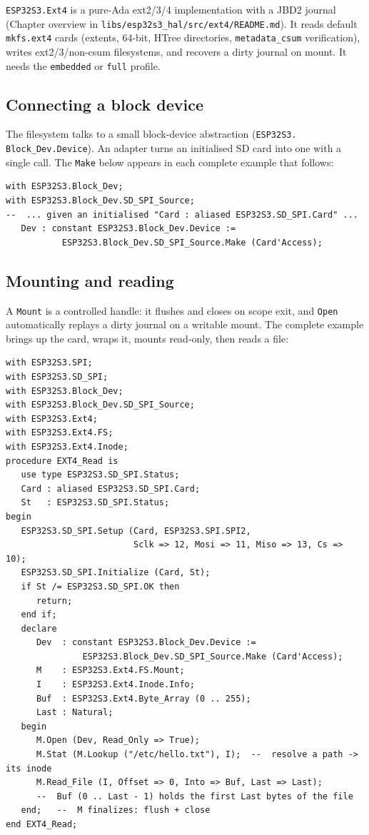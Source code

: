 \texttt{ESP32S3.Ext4} is a pure-Ada ext2/3/4 implementation with a JBD2 journal
(Chapter overview in \texttt{libs/esp32s3\_hal/src/ext4/README.md}). It reads
default \texttt{mkfs.ext4} cards (extents, 64-bit, HTree directories,
\texttt{metadata\_csum} verification), writes ext2/3/non-csum filesystems, and
recovers a dirty journal on mount. It needs the \texttt{embedded} or \texttt{full}
profile.

\subsection{Connecting a block device}

The filesystem talks to a small block-device abstraction (\texttt{ESP32S3.%
Block\_Dev.Device}). An adapter turns an initialised SD card into one with a
single call. The \texttt{Make} below appears in each complete example that
follows:

\begin{lstlisting}
with ESP32S3.Block_Dev;
with ESP32S3.Block_Dev.SD_SPI_Source;
--  ... given an initialised "Card : aliased ESP32S3.SD_SPI.Card" ...
   Dev : constant ESP32S3.Block_Dev.Device :=
           ESP32S3.Block_Dev.SD_SPI_Source.Make (Card'Access);
\end{lstlisting}

\subsection{Mounting and reading}

A \texttt{Mount} is a controlled handle: it flushes and closes on scope exit, and
\texttt{Open} automatically replays a dirty journal on a writable mount. The
complete example brings up the card, wraps it, mounts read-only, then reads a
file:

\begin{lstlisting}
with ESP32S3.SPI;
with ESP32S3.SD_SPI;
with ESP32S3.Block_Dev;
with ESP32S3.Block_Dev.SD_SPI_Source;
with ESP32S3.Ext4;
with ESP32S3.Ext4.FS;
with ESP32S3.Ext4.Inode;
procedure EXT4_Read is
   use type ESP32S3.SD_SPI.Status;
   Card : aliased ESP32S3.SD_SPI.Card;
   St   : ESP32S3.SD_SPI.Status;
begin
   ESP32S3.SD_SPI.Setup (Card, ESP32S3.SPI.SPI2,
                         Sclk => 12, Mosi => 11, Miso => 13, Cs => 10);
   ESP32S3.SD_SPI.Initialize (Card, St);
   if St /= ESP32S3.SD_SPI.OK then
      return;
   end if;
   declare
      Dev  : constant ESP32S3.Block_Dev.Device :=
               ESP32S3.Block_Dev.SD_SPI_Source.Make (Card'Access);
      M    : ESP32S3.Ext4.FS.Mount;
      I    : ESP32S3.Ext4.Inode.Info;
      Buf  : ESP32S3.Ext4.Byte_Array (0 .. 255);
      Last : Natural;
   begin
      M.Open (Dev, Read_Only => True);
      M.Stat (M.Lookup ("/etc/hello.txt"), I);  --  resolve a path -> its inode
      M.Read_File (I, Offset => 0, Into => Buf, Last => Last);
      --  Buf (0 .. Last - 1) holds the first Last bytes of the file
   end;   --  M finalizes: flush + close
end EXT4_Read;
\end{lstlisting}

